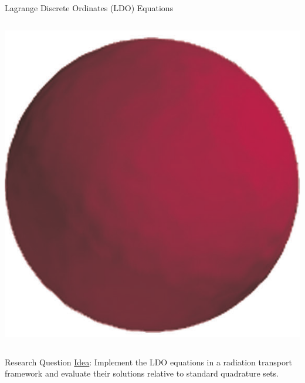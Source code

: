 \documentclass{beamer}
\begin{document}
\begin{frame}{Lagrange Discrete Ordinates (LDO) Equations \nocite{ahrens}}
\begin{columns}
\begin{column}{0.4\textwidth}
\includegraphics[width=\textwidth,natwidth=568,natheight=589]{img/ray-effects-fine-ldo.png}
\end{column}
\end{columns}
%
\end{frame}

\begin{frame}{Research Question}
%
\underline{Idea}: Implement the LDO equations in a radiation transport framework and
evaluate their solutions relative to standard quadrature sets.
%
\end{frame}
\end{document}
